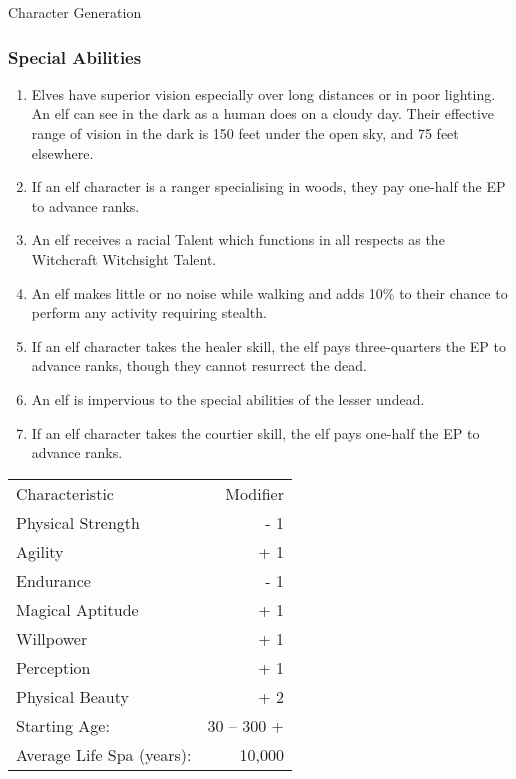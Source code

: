 \begin{Chapter}{Character Generation}
\subsubsection{Special Abilities}

\begin{enumerate}
\item Elves have superior vision especially over long distances or in
  poor lighting.  An elf can see in the dark as a human does on a
  cloudy day. Their effective range of vision in the dark is 150 feet
  under the open sky, and 75 feet elsewhere.

\item If an elf character is a ranger specialising in woods, they pay
  one-half the EP to advance ranks.

\item An elf receives a racial Talent which functions in all respects
  as the Witchcraft Witchsight Talent.

\item An elf makes little or no noise while walking and adds 10\% to
  their chance to perform any activity requiring stealth.

\item If an elf character takes the healer skill, the elf pays
  three-quarters the EP to advance ranks, though they cannot resurrect
  the dead.

\item An elf is impervious to the special abilities of the lesser
  undead.

\item If an elf character takes the courtier skill, the elf pays
  one-half the EP to advance ranks.
\end{enumerate}
  
\begin{tabularx}{\columnwidth}{Xr}
Characteristic			& Modifier \\
Physical Strength		& - 1 \\
Agility				& + 1 \\
Endurance			& - 1 \\ 
Magical Aptitude		& + 1 \\
Willpower			& + 1 \\
Perception			& + 1 \\
Physical Beauty			& + 2 \\
Starting Age:			& 30 -- 300 + \\
Average Life Spa (years):	& ~ 10,000 \\
\end{tabularx}


\end{Chapter}
